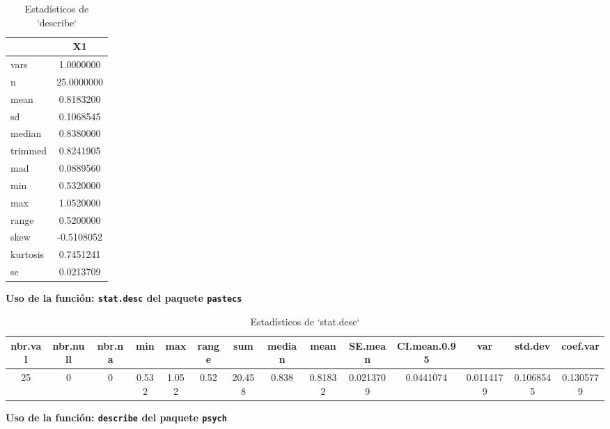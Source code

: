 \documentclass[12pt,a4paper,]{book}
\numberwithin{dummy}{section}
\theoremstyle{ocrenumbox}
\theoremstyle{ocrenumbox}
\theoremstyle{ocrenumbox}
\theoremstyle{ocrenumbox}
\theoremstyle{ocrenum}
\begin{document}
\begin{longtable}[t]{lc}
\caption{\label{tab:unnamed-chunk-7}Estadísticos de `describe`}\\
\toprule
 & X1\\
\midrule
vars & 1.0000000\\
n & 25.0000000\\
mean & 0.8183200\\
sd & 0.1068545\\
median & 0.8380000\\
\addlinespace
trimmed & 0.8241905\\
mad & 0.0889560\\
min & 0.5320000\\
max & 1.0520000\\
range & 0.5200000\\
\addlinespace
skew & -0.5108052\\
kurtosis & 0.7451241\\
se & 0.0213709\\
\bottomrule
\end{longtable}
\endgroup{}

\textbf{Uso de la función: \texttt{stat.desc} del paquete
\texttt{pastecs}}

\begingroup\fontsize{6}{8}\selectfont

\begin{longtable}[t]{cccccccccccccc}
\caption{\label{tab:unnamed-chunk-8}Estadísticos de `stat.desc`}\\
\toprule
nbr.val & nbr.null & nbr.na & min & max & range & sum & median & mean & SE.mean & CI.mean.0.95 & var & std.dev & coef.var\\
\midrule
25 & 0 & 0 & 0.532 & 1.052 & 0.52 & 20.458 & 0.838 & 0.81832 & 0.0213709 & 0.0441074 & 0.0114179 & 0.1068545 & 0.1305779\\
\bottomrule
\end{longtable}
\endgroup{}

\textbf{Uso de la función: \texttt{describe} del paquete \texttt{psych}}

\begingroup\fontsize{6}{8}\selectfont
\end{document}
